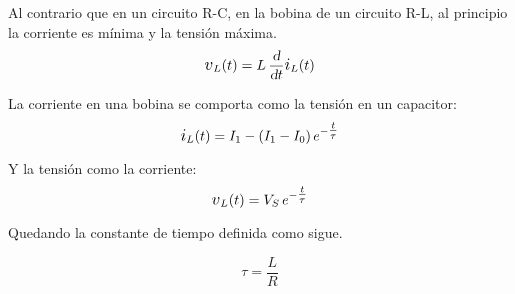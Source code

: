 Al contrario que en un circuito R-C, en la bobina de un circuito R-L, al principio la corriente es mínima y la tensión máxima.
\begin{equation*}
    \voltage_L(t) = L \, \frac{\dif}{\dif t} \current_L(t)
\end{equation*}

La corriente en una bobina se comporta como la tensión en un capacitor:
\begin{equation*}
    \current_L(t) = I_1 - \inParentheses{I_1 - I_0} e^{-\tfrac{t}{\tau}}
\end{equation*}

Y la tensión como la corriente:
\begin{equation*}
    \voltage_L(t) = V_S \, e^{-\tfrac{t}{\tau}}
\end{equation*}

Quedando la constante de tiempo definida como sigue.

\begin{mdframed}[style=DefinitionFrame]
    \begin{defn}
    \end{defn}
    \begin{equation*}
        \tau = \frac{L}{R}
    \end{equation*}
\end{mdframed}